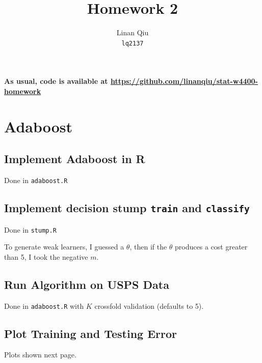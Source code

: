 \documentclass[11pt]{scrartcl}
\title{Homework 2}
\author{Linan Qiu\\\texttt{lq2137}}
\begin{document}
\maketitle

\textbf{As usual, code is available at \url{https://github.com/linanqiu/stat-w4400-homework}}

\section{Adaboost}

\subsection{Implement Adaboost in R}

Done in \texttt{adaboost.R}

\subsection{Implement decision stump \texttt{train} and \texttt{classify}}

Done in \texttt{stump.R}

To generate weak learners, I guessed a $\theta$, then if the $\theta$ produces a cost greater than 5, I took the negative $m$.

\subsection{Run Algorithm on USPS Data}

Done in \texttt{adaboost.R} with $K$ crossfold validation (defaults to 5).

\subsection{Plot Training and Testing Error}

Plots shown next page.
\end{document}
